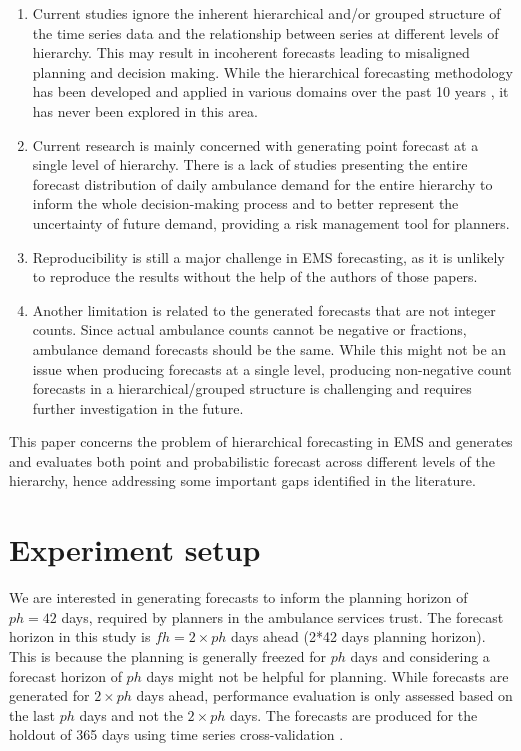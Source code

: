 \documentclass[
  authoryear,
  preprint,
  3p]{elsarticle}
\begin{document}
\begin{enumerate}
\def\labelenumi{\arabic{enumi}.}
\item
  Current studies ignore the inherent hierarchical and/or grouped
  structure of the time series data and the relationship between series
  at different levels of hierarchy. This may result in incoherent
  forecasts leading to misaligned planning and decision making. While
  the hierarchical forecasting methodology has been developed and
  applied in various domains over the past 10 years
  \citep{panagiotelis2022probabilistic}, it has never been explored in
  this area.
\item
  Current research is mainly concerned with generating point forecast at
  a single level of hierarchy. There is a lack of studies presenting the
  entire forecast distribution of daily ambulance demand for the entire
  hierarchy to inform the whole decision-making process and to better
  represent the uncertainty of future demand, providing a risk
  management tool for planners.
\item
  Reproducibility is still a major challenge in EMS forecasting, as it
  is unlikely to reproduce the results without the help of the authors
  of those papers.
\item
  Another limitation is related to the generated forecasts that are not
  integer counts. Since actual ambulance counts cannot be negative or
  fractions, ambulance demand forecasts should be the same. While this
  might not be an issue when producing forecasts at a single level,
  producing non-negative count forecasts in a hierarchical/grouped
  structure is challenging and requires further investigation in the
  future.
\end{enumerate}

This paper concerns the problem of hierarchical forecasting in EMS and
generates and evaluates both point and probabilistic forecast across
different levels of the hierarchy, hence addressing some important gaps
identified in the literature.

\hypertarget{sec-experiment}{%
\section{Experiment setup}\label{sec-experiment}}

We are interested in generating forecasts to inform the planning horizon
of \(ph= 42\) days, required by planners in the ambulance services
trust. The forecast horizon in this study is \(fh = 2 \times ph\) days
ahead (2*42 days planning horizon). This is because the planning is
generally freezed for \(ph\) days and considering a forecast horizon of
\(ph\) days might not be helpful for planning. While forecasts are
generated for \(2 \times ph\) days ahead, performance evaluation is only
assessed based on the last \(ph\) days and not the \(2 \times ph\) days.
The forecasts are produced for the holdout of 365 days using time series
cross-validation \citep{hyndman2021forecasting}.
\end{document}
